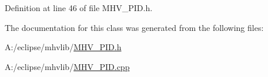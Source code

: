 \-Definition at line 46 of file \-M\-H\-V\-\_\-\-P\-I\-D.\-h.



\-The documentation for this class was generated from the following files\-:\begin{DoxyCompactItemize}
\item 
\-A\-:/eclipse/mhvlib/\hyperlink{_m_h_v___p_i_d_8h}{\-M\-H\-V\-\_\-\-P\-I\-D.\-h}\item 
\-A\-:/eclipse/mhvlib/\hyperlink{_m_h_v___p_i_d_8cpp}{\-M\-H\-V\-\_\-\-P\-I\-D.\-cpp}\end{DoxyCompactItemize}
